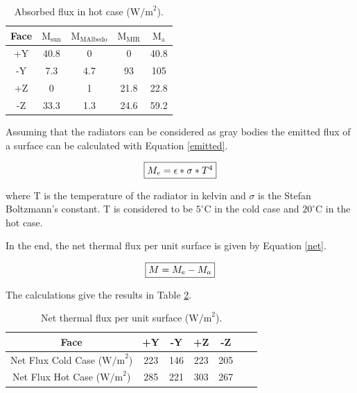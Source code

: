 \documentclass[a4paper, oneside, 11pt]{article}
\begin{document}
\begin{table}[!h]
 \caption{Absorbed flux in hot case ($\text{W/m}^\text{2}$).}
 \label{AbsorbedHot}
\centering \begin{tabular}{| c | c |c |c |c |}
  \hline
Face &  $\text{M}_\text{{sun}}$ & $\text{M}_\text{{MAlbedo}}$& $\text{M}_\text{{MIR}}$ & $\text{M}_\text{a}$  \\
\hline
+Y & 40.8 & 0 & 0 & 40.8 \\
     \hline
-Y & 7.3	 & 4.7	 & 93  & 105  \\
     \hline
+Z & 0 & 1 & 21.8 & 22.8 \\
     \hline
-Z & 33.3 & 1.3& 24.6 & 59.2\\
     \hline
\end{tabular}
\end{table}


Assuming that the radiators can be considered as gray bodies the emitted flux of a surface can be calculated with Equation \ref{emitted}.

\begin{equation}
\fbox{$M_e=\epsilon*\sigma*T^4$}
\label{emitted}
\end{equation}

where T is the temperature of the radiator in kelvin and $\sigma$ is the Stefan Boltzmann's constant. T is considered to be $5^{\circ}$C in the cold case and $20^{\circ}$C in the hot case.

In the end, the net thermal flux per unit surface is given by Equation \ref{net}.

\begin{equation}
\fbox{$M=M_e-M_a$}
\label{net}
\end{equation}

The calculations give the results in Table \ref{netTable}.

\begin{table}[H]
 \caption{Net thermal flux per unit surface ($\text{W/m}^\text{2}$).}
 \label{netTable}
\centering \begin{tabular}{| c | c |c |c |c |c |c |}
  \hline
Face &  +Y & -Y & +Z & -Z \\
     \hline
Net Flux Cold Case ($\text{W/m}^\text{2}$) & 223 & 146 & 223  & 205 \\
     \hline
 Net Flux Hot Case ($\text{W/m}^\text{2}$) & 285 & 221 &  303 &  267 \\
     \hline
\end{tabular}
\end{table}
\end{document}
